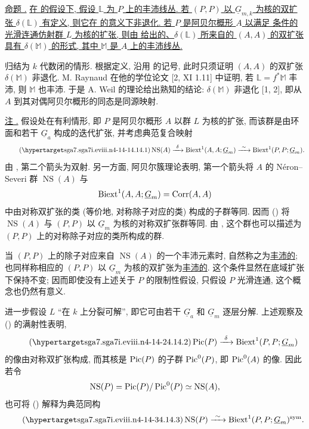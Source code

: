 \medskip
\noindent\underline{命题 .} \underline{在  的假设下, 假设 $\mathbb L$ 为 $P$ 上的丰沛线丛. 若 $(P,P)$ 以 $\underline G_{m,k}$ 为核的双扩张 $\delta(\mathbb L)$ 有定义, 则它在  的意义下非退化. 若 $P$ 是阿贝尔概形 $A$ 以满足  条件的光滑连通仿射群 $L$ 为核的扩张, 则由  给出的、$\delta(\mathbb L)$ 所来自的 $(A,A)$ 的双扩张具有 $\delta(\mathbb M)$ 的形式, 其中 $\mathbb M$ 是 $A$ 上的丰沛线丛.}

归结为 $k$ 代数闭的情形. 根据定义, 沿用  的记号, 此时只须证明 $(A,A)$ 的双扩张 $\delta(\mathbb M)$ 非退化. M. Raynaud 在他的学位论文 [2, XI 1.11] 中证明, 若 $\mathbb L=f^*\mathbb M$ 丰沛, 则 $\mathbb M$ 也丰沛. 于是 A. Weil 的理论给出熟知的结论: $\delta(\mathbb M)$ 非退化 [1, 2], 即从 $A$ 到其对偶阿贝尔概形的同态是同源映射.

\medskip
\noindent\underline{注 .} 假设处在有利情形, 即 $P$ 是阿贝尔概形 $A$ 以群 $L$ 为核的扩张, 而该群是由环面和若干 $\underline G_a$ 构成的迭代扩张, 并考虑典范复合映射
\begin{equation}\tag{\SGARefTarget{sga7.sga7i.eviii.n4-14-1}{4.14.1}}
 \operatorname{NS}(A)
 \xrightarrow{\ \delta\ }
 \Biext^1(A,A;\underline G_m)
 \xrightarrow{\ \sim\ }
 \Biext^1(P,P;\underline G_m).
\end{equation}
由 , 第二个箭头为双射. 另一方面, 阿贝尔簇理论表明, 第一个箭头将 $A$ 的 N\'eron--Severi 群 $\operatorname{NS}(A)$ 与
\[
 \Biext^1(A,A;\underline G_m)=\operatorname{Corr}(A,A)
\]
中由对称双扩张的类 (等价地, 对称除子对应的类) 构成的子群等同. 因而 () 将 $\operatorname{NS}(A)$ 与 $(P,P)$ 以 $\underline G_m$ 为核的对称双扩张群等同. 由 , 这个群也可以描述为 $(P,P)$ 上的对称除子对应的类所构成的群.

当 $(P,P)$ 上的除子对应来自 $\operatorname{NS}(A)$ 的一个丰沛元素时, 自然称之为\underline{丰沛的}; 也同样称相应的 $(P,P)$ 以 $\underline G_m$ 为核的双扩张为\underline{丰沛的}. 这个条件显然在底域扩张下保持不变; 因而即使没有上述关于 $P$ 的限制性假设, 只假设 $P$ 光滑连通, 这个概念也仍然有意义.

进一步假设 $L$ “在 $k$ 上分裂可解”, 即它可由若干 $\underline G_a$ 和 $\underline G_m$ 逐层分解. 上述观察及 () 的满射性表明,
\begin{equation}\tag{\SGARefTarget{sga7.sga7i.eviii.n4-14-2}{4.14.2}}
 \Pic(P)\xrightarrow{\ \delta\ }
 \Biext^1(P,P;\underline G_m)
\end{equation}
的像由对称双扩张构成, 而其核是 $\operatorname{Pic}(P)$ 的子群 $\operatorname{Pic}^0(P)$, 即 $\operatorname{Pic}^0(A)$ 的像. 因此若令
\[
 \operatorname{NS}(P)=\operatorname{Pic}(P)/\operatorname{Pic}^0(P)
 \simeq\operatorname{NS}(A),
\]
也可将 () 解释为典范同构
\begin{equation}\tag{\SGARefTarget{sga7.sga7i.eviii.n4-14-3}{4.14.3}}
 \operatorname{NS}(P)
 \xrightarrow{\ \sim\ }
 \Biext^1(P,P;\underline G_m)^{\mathrm{sym}}.
\end{equation}

